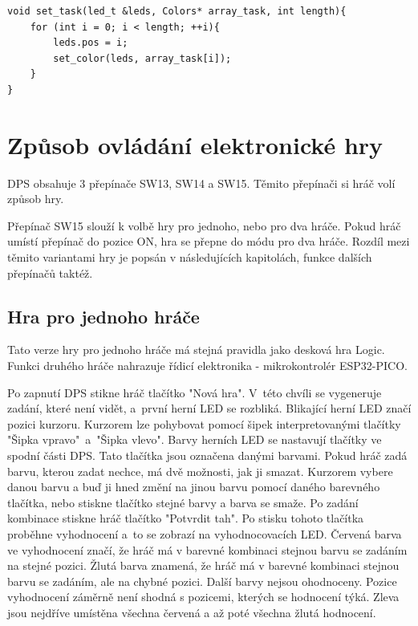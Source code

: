 \begin{minipage}{\linewidth}
\begin{lstlisting}[frame=single,numbers=right,caption={Funkce pro vygenerování zadání.},label=lst:priklad.vypis.kodu.C,basicstyle=\ttfamily\small, keywordstyle=\color{black}\bfseries\underbar,]
void set_task(led_t &leds, Colors* array_task, int length){
    for (int i = 0; i < length; ++i){
        leds.pos = i;
        set_color(leds, array_task[i]); 
    } 
}      
\end{lstlisting}
\end{minipage}

\fi

\chapter{Způsob ovládání elektronické hry}
DPS obsahuje 3 přepínače SW13, SW14 a SW15. Těmito přepínači si hráč volí způsob hry.

Přepínač SW15 slouží k volbě hry pro jednoho, nebo pro dva hráče. Pokud hráč umístí přepínač do pozice ON, hra se přepne
do módu pro dva hráče. Rozdíl mezi těmito variantami hry je popsán v následujících kapitolách, funkce dalších přepínačů taktéž.

\section{Hra pro jednoho hráče}
Tato verze hry pro jednoho hráče má stejná pravidla jako desková hra Logic. Funkci druhého hráče nahrazuje řídicí elektronika
- mikrokontrolér ESP32-PICO.

Po zapnutí DPS stikne hráč tlačítko "Nová hra". V~této chvíli se vygeneruje zadání, které není vidět, a~první herní LED se 
rozbliká. Blikající herní LED značí pozici kurzoru. 
Kurzorem lze pohybovat pomocí šipek interpretovanými tlačítky "Šipka vpravo"\  a~"Šipka vlevo". Barvy herních LED se nastavují 
tlačítky ve spodní části DPS. Tato tlačítka jsou označena danými barvami. Pokud hráč zadá barvu, kterou zadat nechce, má dvě možnosti,
jak ji smazat. Kurzorem vybere danou barvu a buď ji hned změní na jinou barvu pomocí daného barevného tlačítka, nebo stiskne tlačítko 
stejné barvy a barva se smaže. 
Po zadání kombinace stiskne hráč tlačítko "Potvrdit tah". Po stisku tohoto tlačítka proběhne vyhodnocení a~to se zobrazí na 
vyhodnocovacích LED. 
Červená barva ve vyhodnocení značí, že hráč má v barevné kombinaci stejnou barvu se zadáním na stejné pozici. Žlutá barva znamená,
že hráč má v barevné kombinaci stejnou barvu se zadáním, ale na chybné pozici. Další barvy nejsou ohodnoceny. Pozice vyhodnocení
záměrně není shodná s pozicemi, kterých se hodnocení týká. Zleva jsou nejdříve umístěna všechna červená a až poté všechna žlutá 
hodnocení.

